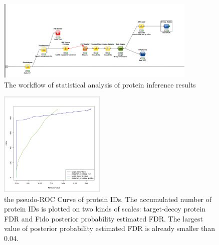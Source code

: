 \begin{figure}[htbp]
  \centering
  \includegraphics[width=0.85\textwidth]{graphics/protein_inference/ProteinInferenceKNIME_workflow.pdf}
  \caption{The workflow of statistical analysis of protein inference results}
  \label{fig:proteininference}
\end{figure}

\begin{figure}[htbp]
  \centering
  \includegraphics[width=0.45\textwidth]{graphics/protein_inference/proteinFDR.png}
  \caption{the pseudo-ROC Curve of protein IDs. The accumulated number of protein IDs is plotted on two kinds of scales: target-decoy protein FDR and Fido posterior probability estimated FDR. The largest value of posterior probability estimated FDR is already smaller than 0.04.}
  \label{fig:proteinfdr}
\end{figure}

                                                                                                                      